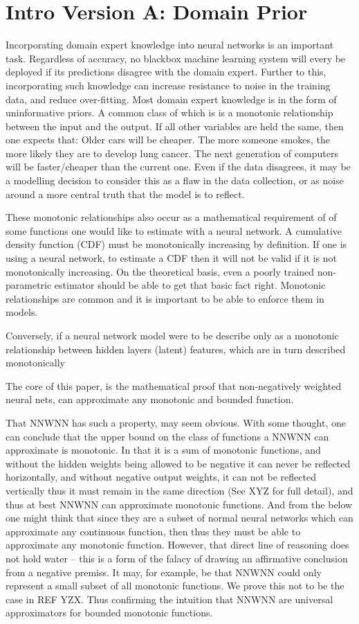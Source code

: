 \documentclass[]{article}
\begin{document}
\section{Intro Version A: Domain Prior}
Incorporating domain expert  knowledge into neural networks is an important task.
Regardless of accuracy, no blackbox machine learning system will every be deployed if its predictions disagree with the domain expert.
Further to this, incorporating such knowledge can increase resistance to noise in the training data, and reduce over-fitting.
Most domain expert knowledge is in the form of uninformative priors.
A common class of which is is a monotonic relationship between the input and the output.
If all other variables are held the same, then one expects that:
Older cars will be cheaper.
The more someone smokes, the more likely they are to develop lung cancer.
The next generation of computers will be faster/cheaper than the current one.
Even if the data disagrees, it may be a modelling decision to consider this as a flaw in the data collection, or as noise around a more central truth that the model is to reflect. 

These monotonic relationships also occur as a mathematical requirement of of some functions one would like to estimate with a neural network.
A cumulative density function (CDF) must be monotonically increasing by definition.
If one is using a neural network, to estimate a CDF then it will not be valid if it is not monotonically increasing.
On the theoretical basis, even a poorly trained non-parametric estimator should be able to get that basic fact right.
Monotonic relationships are common and it is important to be able to enforce them in models.


Conversely, if a neural network model were to be describe only as a monotonic relationship between hidden layers (latent) features, which are in turn described monotonically


The core of this paper, is the mathematical proof that non-negatively weighted neural nets, can approximate any monotonic and bounded function.

That NNWNN has such a property, may seem obvious.
With some thought, one can conclude that the upper bound on the class of functions a NNWNN can approximate is monotonic.
In that it is a sum of monotonic functions, and without the hidden weights being allowed to be negative it can never be reflected horizontally, and without negative output weights, it can not be reflected vertically thus it must remain in the same direction (See XYZ for full detail), and thus at best NNWNN can approximate monotonic functions.
And from the below one might think that since they are a subset of normal neural networks which can approximate any continuous function, then thus they must be able to approximate any monotonic function.
However, that direct line of reasoning does not hold water -- this is a form of the falacy of drawing an affirmative conclusion from a negative premiss.
It may, for example, be that NNWNN could only represent a small subset of all monotonic functions.
We prove this not to be the case in REF YZX.
Thus confirming the intuition that NNWNN are universal approximators for bounded monotonic functions. 
 
\end{document}
